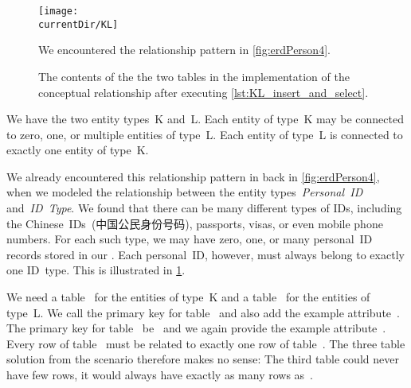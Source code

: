 %
%
\label{sec:rm:kl}%
%
\begin{figure}%
\centering%
\texttt{[image: \\currentDir/KL]}%
\caption{We encountered the  relationship pattern in \cref{fig:erdPerson4}.}%
\label{fig:rm:kl}%
\end{figure}%
%
%
%
%
%
%
%
\begin{figure}%
\centering%
\floatSep%
%
\floatSep%
%
\floatSep%
\caption{The contents of the the two tables in the implementation of the  conceptual relationship after executing \cref{lst:KL_insert_and_select}.}%
\label{fig:rm:kl:tables}%
\end{figure}%
%
We have the two entity types~K and~L.
Each entity of type~K may be connected to zero, one, or multiple entities of type~L.
Each entity of type~L is connected to exactly one entity of type~K.

We already encountered this relationship pattern in back in \cref{fig:erdPerson4}, when we modeled the relationship between the entity types~\emph{Personal~ID} and~\emph{ID~Type}.
We found that there can be many different types of IDs, including the Chinese~IDs~(中国公民身份号码), passports, visas, or even mobile phone numbers.
For each such type, we may have zero, one, or many personal~ID records stored in our \db.
Each personal~ID, however, must always belong to exactly one ID~type.
This is illustrated in \cref{fig:rm:kl}.

We need a table~ for the entities of type~K and a table~ for the entities of type~L.
We call the primary key for table~  and also add the example attribute~.
The primary key for table~ be~ and we again provide the example attribute~.
Every row of table~ must be related to exactly one row of table~.
The three table solution from the  scenario therefore makes no sense:
The third table could never have few rows, it would always have exactly as many rows as~.

